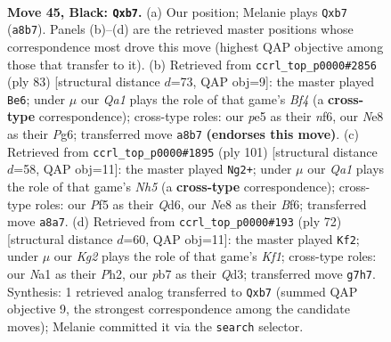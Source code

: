 \documentclass[11pt]{article}
\begin{document}
\clearpage

\begin{figure}[p]\centering
\begin{subfigure}{0.46\textwidth}\centering
\resizebox{\linewidth}{!}{%
\newchessgame
\chessboard[
  setfen={q3n3/1P1b2k1/p7/4Pp1p/3P2p1/N1Q5/5PPP/n3K1N1 b - - 0 45},
  showmover=false,
  pgfstyle=straightmove, color=movearrow, markmove={a8-b7}
]}
\caption{}
\end{subfigure}\hfill
\begin{subfigure}{0.46\textwidth}\centering
\resizebox{\linewidth}{!}{%
\newchessgame
\chessboard[
  setfen={5k2/5p2/2p2Np1/p1P1Qb2/P6K/2P2P2/7P/6q1 b - - 0 42},
  showmover=false,
  pgfstyle=straightmove, color=movearrow, markmove={f5-e6}
]}
\caption{}
\end{subfigure}
\\[4pt]
\begin{subfigure}{0.46\textwidth}\centering
\resizebox{\linewidth}{!}{%
\newchessgame
\chessboard[
  setfen={8/6k1/3qpb2/p1p5/P4P1n/1P3pP1/2Q5/3NK1B1 b - - 0 51},
  showmover=false,
  pgfstyle=straightmove, color=movearrow, markmove={h4-g2}
]}
\caption{}
\end{subfigure}\hfill
\begin{subfigure}{0.46\textwidth}\centering
\resizebox{\linewidth}{!}{%
\newchessgame
\chessboard[
  setfen={8/pp4k1/7p/4qpp1/3n4/1PNQ1PP1/P6P/5K2 w - - 0 37},
  showmover=false,
  pgfstyle=straightmove, color=movearrow, markmove={f1-f2}
]}
\caption{}
\end{subfigure}
\caption{\textbf{Move 45, Black: \texttt{Qxb7}.} (a) Our position; Melanie plays \texttt{Qxb7} (\texttt{a8b7}). Panels (b)--(d) are the retrieved master positions whose correspondence most drove this move (highest QAP objective among those that transfer to it). (b) Retrieved from \texttt{ccrl\_top\_p0000\#2856} (ply 83) [structural distance $d$=73, QAP obj=9]: the master played \texttt{Be6}; under $\mu$ our \emph{Qa1} plays the role of that game's \emph{Bf4} (a \textbf{cross-type} correspondence); cross-type roles: our \emph{p}e5 as their \emph{n}f6, our \emph{N}e8 as their \emph{P}g6; transferred move \texttt{a8b7} \textbf{(endorses this move)}. (c) Retrieved from \texttt{ccrl\_top\_p0000\#1895} (ply 101) [structural distance $d$=58, QAP obj=11]: the master played \texttt{Ng2+}; under $\mu$ our \emph{Qa1} plays the role of that game's \emph{Nh5} (a \textbf{cross-type} correspondence); cross-type roles: our \emph{P}f5 as their \emph{Q}d6, our \emph{N}e8 as their \emph{B}f6; transferred move \texttt{a8a7}. (d) Retrieved from \texttt{ccrl\_top\_p0000\#193} (ply 72) [structural distance $d$=60, QAP obj=11]: the master played \texttt{Kf2}; under $\mu$ our \emph{Kg2} plays the role of that game's \emph{Kf1}; cross-type roles: our \emph{N}a1 as their \emph{P}h2, our \emph{p}b7 as their \emph{Q}d3; transferred move \texttt{g7h7}. Synthesis: 1 retrieved analog transferred to \texttt{Qxb7} (summed QAP objective 9, the strongest correspondence among the candidate moves); Melanie committed it via the \texttt{search} selector.}
\label{fig:thought-m89}
\end{figure}
\end{document}
